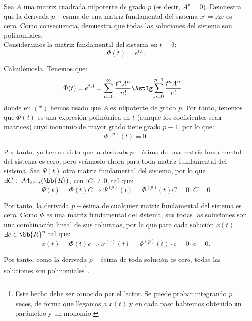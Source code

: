 \documentclass[12pt]{article}
\begin{document}
    \begin{ejercicio}
        Sea $A$ una matriz cuadrada nilpotente de grado $p$ (es decir, $A^p=0$). Demuestra que la derivada $p-$ésima de una matriz fundamental del sistema $x'=Ax$ es cero. Como consecuencia, demuestra que todas las soluciones del sistema son polinomiales.\\

        Consideramos la matriz fundamental del sistema en $t=0$:
        \begin{equation*}
            \Phi(t)=e^{tA}.
        \end{equation*}

        Calculémosla. Tenemos que:
        \begin{align*}
            \Phi(t)&=e^{tA}=\sum_{n=0}^{\infty}\dfrac{t^nA^n}{n!}
            \AstIg
            \sum_{n=0}^{p-1}\dfrac{t^nA^n}{n!}
        \end{align*}
        donde en $(\ast)$ hemos usado que $A$ es nilpotente de grado $p$. Por tanto, tenemos que $\Phi(t)$ es una expresión polinómica en $t$ (aunque los coeficientes sean matrices) cuyo monomio de mayor grado tiene grado $p-1$, por lo que:
        \begin{equation*}
            \Phi^{(p)}(t)=0.
        \end{equation*}

        Por tanto, ya hemos visto que la derivada $p-$ésima de una matriz fundamental del sistema es cero; pero veámoslo ahora para toda matriz fundamental del sistema. Sea $\Psi(t)$ otra matriz fundamental del sistema, por lo que $\exists C\in\mathcal{M}_{n\times n}(\bb{R})$, con $|C|\neq 0$, tal que:
        \begin{equation*}
            \Psi(t)=\Phi(t)C
            \Longrightarrow
            \Psi^{(p)}(t)=\Phi^{(p)}(t)C=0\cdot C=0
        \end{equation*}

        Por tanto, la derivada $p-$ésima de cualquier matriz fundamental del sistema es cero. Como $\Phi$ es una matriz fundamental del sistema, sus todas las soluciones son una combinación lineal de sus columnas, por lo que para cada solución $x(t)$ $\exists c\in \bb{R}^n$ tal que:
        \begin{equation*}
            x(t)=\Phi(t)c
            \Longrightarrow
            x^{(p)}(t)=\Phi^{(p)}(t)\cdot c=0\cdot c=0.
        \end{equation*}

        Por tanto, como la derivada $p-$ésima de toda solución es cero, todas las soluciones son polinomiales\footnote{Este hecho debe ser conocido por el lector. Se puede probar integrando $p$ veces, de forma que llegamos a $x(t)$ y en cada paso habremos obtenido un parámetro y un monomio.}.
    \end{ejercicio}
\end{document}
